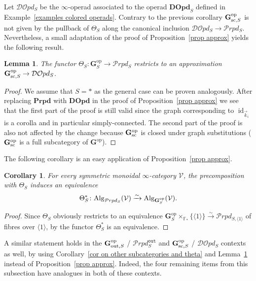 \documentclass{amsart}
\numberwithin{theorem}{subsection}
\newtheorem{cor}[theorem]{Corollary}
\newtheorem{lemma}[theorem]{Lemma}
\theoremstyle{definition}
\providecommand{\op}{\mathrm{op}}
\newcommand{\xV}{\mathcal{V}}
\newcommand{\id}{\operatorname{id}}
\newcommand{\icat}{$\infty$-category}
\newcommand{\isoto}{\xrightarrow{\sim}}
\newcommand{\name}[1]{\ensuremath{\text{\textup{#1}}}}
\newcommand{\bbY}{\mathbf{G}}
\newcommand{\Alg}{\name{Alg}}
\newcommand{\out}{\mathtt{out}}
\newcommand{\calproperad}{\mathcal{P}rpd}
\newcommand{\nsqelt}[1]{\vec{#1}}
\begin{document}
	Let $\mathcal{DO}pd_S$ be the $\infty$-operad associated to the operad $\mathbf{DOpd}_S$ defined in Example~\ref{examples colored operads}. Contrary to the previous corollary $\bbY^{\op}_{\name{sc}, S}$ is not given by the pullback of $\Theta_S$ along the canonical inclusion $\mathcal{DO}pd_S\to \calproperad_{S}$. Nevertheless, a small adaptation of the proof of  Proposition~\ref{prop approx} yields the following result. 
\begin{lemma}\label{lem DOpd app}
The functor $\Theta_S\colon \bbY^\op_S\to  \calproperad_{S}$ restricts to an approximation $\bbY^{\op}_{\name{sc}, S}\to \mathcal{DO}pd_S$. 
\end{lemma}
\begin{proof}
	We assume that $S=*$ as the general case can be proven analogously.
	After replacing $\mathbf{Prpd}$ with $\mathbf{DOpd}$ in the proof of Proposition~\ref{prop approx} we see that the first part of the proof is still valid since the graph corresponding to $\id_{\nsqelt{k}_i} $ is a corolla and in particular simply-connected. The second part of the proof is also not affected by the change because $\bbY^{\op}_{\name{sc}}$ is closed under graph substitutions ($\bbY^{\op}_{\name{sc}}$ is a full subcategory of $\bbY^\op$).
\end{proof}

The following corollary is an easy application of Proposition~\ref{prop approx}.
\begin{cor}\label{cor:OOpSeq}
For every symmetric monoidal \icat{} $\xV$, the precomposition with $\Theta_{S}$ induces an equivalence
\[\Theta_{S}^{*} \colon \Alg_{\calproperad_{S}}(\xV) \isoto	\Alg_{\bbY^\op_{S}}(\xV).\] 
\end{cor}
\begin{proof}
	Since $\Theta_{S}$ obviously restricts to an equivalence $\bbY^\op_{S}\times_{\mathbb{F}_*}\{\langle 1\rangle\}\isoto \calproperad_{{S},\langle 1\rangle}$ of fibres over $\langle 1\rangle$, by
	\cite[Theorem 2.3.3.23]{ha} the functor $\Theta_{S}^{*}$ is an equivalence.
\end{proof}

A similar statement holds in the $\bbY_{\name{out},S}^\op$ / $\calproperad^{\out}_S$ and $\bbY_{\name{sc}, S}^\op$ / $\mathcal{DO}pd_S$ contexts as well, by
using Corollary~\ref{cor on other subcategories and theta} and Lemma~\ref{lem DOpd app} instead of Proposition~\ref{prop approx}.
Indeed, the four remaining items from this subsection have analogues in both of these contexts.
\end{document}
